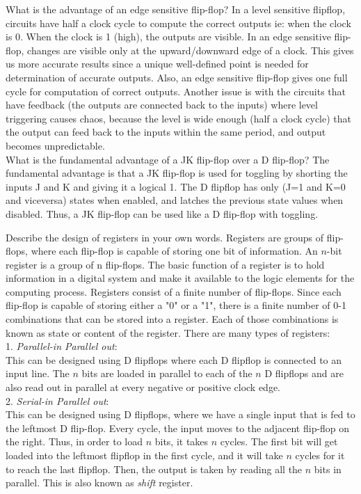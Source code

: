 \begin{ExerciseList}
\Exercise
What is the advantage of an edge sensitive flip-flop?
\Answer
In a level sensitive flipflop, circuits have half a clock cycle to compute the correct outputs ie: when the clock is 0. When the clock is 1 (high), the outputs are visible. In an edge sensitive flip-flop, changes are visible only at the upward/downward edge of a clock. This gives us more accurate results since a unique well-defined point is needed for determination of accurate outputs. Also, an edge sensitive flip-flop gives one full cycle for computation of correct outputs. Another issue is with the circuits that have feedback (the outputs are connected back to the inputs) where level triggering causes chaos, because the level is wide enough (half a clock cycle) that the output can feed back to the inputs within the same period, and output becomes unpredictable.     \\
\Exercise[difficulty = 1]
What is the fundamental advantage of a JK flip-flop over a D flip-flop? 
\Answer
The fundamental advantage is that a JK flip-flop is used for toggling by shorting the inputs J and K and giving it a logical 1. The D flipflop has only (J=1 and K=0 and viceversa) states when enabled, and latches the previous state values when disabled. Thus, a JK flip-flop can be used like a D flip-flop with toggling.
 
\Exercise
Describe the design of registers in your own words.
\Answer
Registers are groups of flip-flops, where each flip-flop is capable of storing one bit of information. An $n$-bit register is a group of n flip-flops. The basic function of a register is to hold information in a digital system and make it available to the logic elements for the computing process. Registers consist of a finite number of flip-flops. Since each flip-flop is capable of storing either a "0" or a "1", there is a finite number of 0-1 combinations that can be stored into a register. Each of those combinations is known as state or content of the register. There are many types of registers: \\
1. \textit{Parallel-in Parallel out}: \\
This can be designed using D flipflops where each D flipflop is connected to an input line. The $n$ bits are loaded in parallel to each of the $n$ D flipflops and are also read out in parallel at every negative or positive clock edge. \\
2. \textit{Serial-in Parallel out}: \\
This can be designed using D flipflops, where we have a single input that is fed to the leftmost D flip-flop. Every cycle, the input moves to the adjacent flip-flop on the right. Thus, in order to load $n$ bits, it takes $n$ cycles. The first bit will get loaded into the leftmost flipflop in the first cycle, and it will take $n$ cycles for it to reach the last flipflop. Then, the output is taken by reading all the $n$ bits in parallel. This is also known as \textit{shift} register. \\


\end{ExerciseList}
